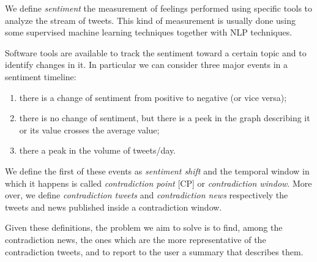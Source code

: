 We define \emph{sentiment} the measurement of feelings performed using specific tools to analyze the stream of tweets.
This kind of measurement is usually done using some supervised machine learning techniques together with NLP techniques.

Software tools are available to track the sentiment toward a certain topic and to identify changes in it. In particular we can consider three major events in a sentiment timeline:

\begin{enumerate}
	\item there is a change of sentiment from positive to negative (or
		vice versa);
	\item there is no change of sentiment, but there is a peek in the graph
		describing it or its value crosses the average value;
	\item there a peak in the volume of tweets/day.
\end{enumerate}

We define the first of these events as \emph{sentiment shift} and the temporal window in which it happens is called \emph{contradiction point} [CP] or \emph{contradiction window}. 
More over, we define \emph{contradiction tweets} and \emph{contradiction news} respectively the tweets and news published inside a contradiction window.

Given these definitions, the problem we aim to solve is to find, among the contradiction news, the ones which are the more representative of the contradiction tweets, and to report to the user a summary that describes them.
